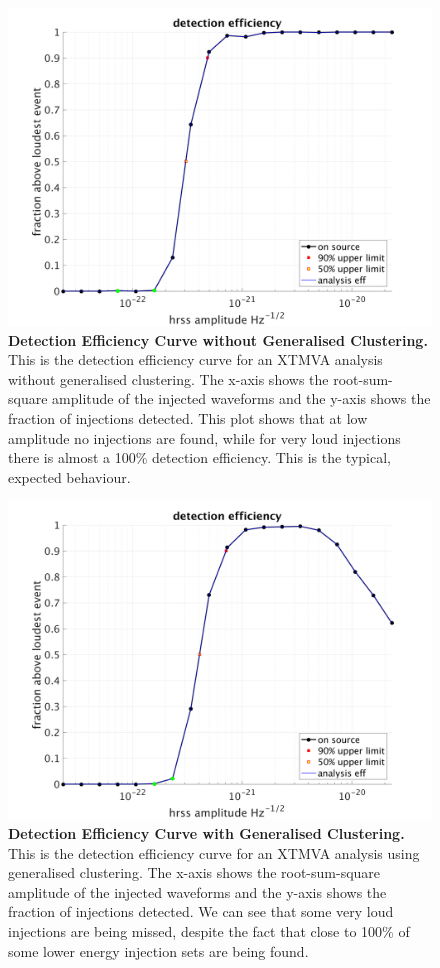 \documentclass[11pt]{cuthesis}
\begin{document}
\begin{figure} %
\begin{center}
\includegraphics[width=0.8\linewidth]{no_gc_eff_nsbh.png}
\end{center}
\caption{\textbf{Detection Efficiency Curve without Generalised Clustering.} This is the detection efficiency curve for an XTMVA analysis without generalised clustering. The x-axis shows the root-sum-square amplitude of the injected waveforms and the y-axis shows the fraction of injections detected. This plot shows that at low amplitude no injections are found, while for very loud injections there is almost a 100\% detection efficiency. This is the typical, expected behaviour. }
\label{fig:no gc eff}
\end{figure}

\begin{figure} %
\begin{center}
\includegraphics[width=0.8\linewidth]{gc_eff_nsbh.png}
\end{center}
\caption{\textbf{Detection Efficiency Curve with Generalised Clustering.} This is the detection efficiency curve for an XTMVA analysis using generalised clustering. The x-axis shows the root-sum-square amplitude of the injected waveforms and the y-axis shows the fraction of injections detected. We can see that some very loud injections are being missed, despite the fact that close to 100\% of some lower energy injection sets are being found. }
\label{fig:gc eff}
\end{figure}
\end{document}
